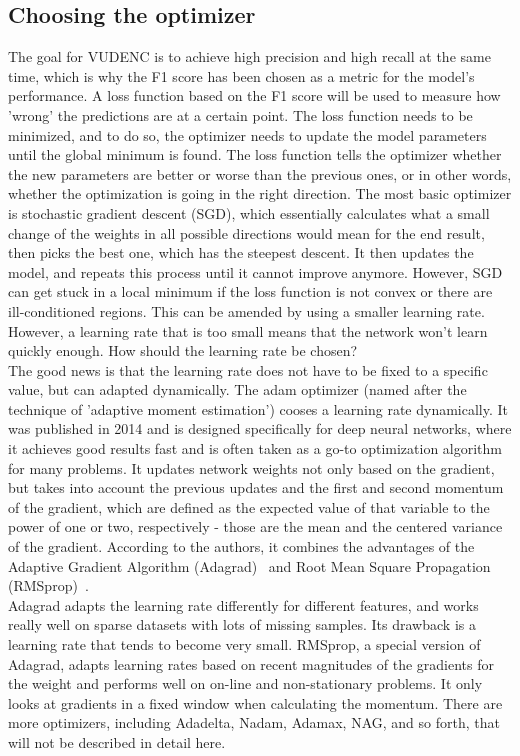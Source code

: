 \documentclass[
a4paper,
pagesize,
pdftex,
12pt,
twoside, %
BCOR=5mm, %
ngerman,
fleqn,
final,
]{scrartcl}
\begin{document}
	\subsection{Choosing the optimizer}\label{optimizer}
	The goal for VUDENC is to achieve high precision and high recall at the same time, which is why the F1 score has been chosen as a metric for the model's performance. A loss function based on the F1 score will be used to measure how 'wrong' the predictions are at a certain point. The loss function needs to be minimized, and to do so, the optimizer needs to update the model parameters until the global minimum is found. The loss function tells the optimizer whether the new parameters are better or worse than the previous ones, or in other words, whether the optimization is going in the right direction. The most basic optimizer is stochastic gradient descent (SGD), which essentially calculates what a small change of the weights in all possible directions would mean for the end result, then picks the best one, which has the steepest descent. It then updates the model, and repeats this process until it cannot improve anymore. However, SGD can get stuck in a local minimum if the loss function is not convex or there are ill-conditioned regions. This can be amended by using a smaller learning rate. However, a learning rate that is too small means that the network won't learn quickly enough. How should the learning rate be chosen?\\
	The good news is that the learning rate does not have to be fixed to a specific value, but can adapted dynamically. The adam optimizer (named after the technique of 'adaptive moment estimation') cooses a learning rate dynamically. It was published in 2014 \cite{Kingma.2014} and is designed specifically for deep neural networks, where it achieves good results fast and is often taken as a go-to optimization algorithm for many problems. It updates network weights not only based on the gradient, but takes into account the previous updates and the first and second momentum of the gradient, which are defined as the expected value of that variable to the power of one or two, respectively - those are the mean and the centered variance of the gradient. According to the authors, it combines the advantages of the Adaptive Gradient Algorithm (Adagrad)~\cite{Duchi.2011} and Root Mean Square Propagation (RMSprop)~\cite{Tieleman.2012}.\\
	Adagrad adapts the learning rate differently for different features, and works really well on sparse datasets with lots of missing samples. Its drawback is a learning rate that tends to become very small. RMSprop, a special version of Adagrad, adapts learning rates based on recent magnitudes of the gradients for the weight and performs well on on-line and non-stationary problems. It only looks at gradients in a fixed window when calculating the momentum. There are more optimizers, including Adadelta, Nadam, Adamax, NAG, and so forth, that will not be described in detail here.\\
\end{document}
